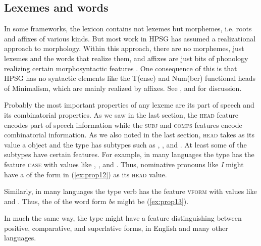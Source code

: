 \documentclass[output=paper
	        ,collection
	        ,collectionchapter
 	        ,biblatex
                ,babelshorthands
                ,newtxmath
                ,draftmode
                ,colorlinks, citecolor=brown
]{langscibook}
\begin{document}
\subsection{Lexemes and words}\label{sec:prop4.1}

In some frameworks, the lexicon contains not lexemes but morphemes, i.e. roots and affixes of various kinds. But most work in HPSG has assumed a realizational approach to morphology. Within this approach, there are no morphemes, just lexemes and the words that realize them, and affixes are just bits of phonology realizing certain morphosyntactic features \citep{Stump2001a-u-kopiert,Anderson92a-u}. One consequence of this is that HPSG has no syntactic elements like the T(ense) and Num(ber) functional heads of Minimalism\indexmp, which are mainly realized by affixes. See , \addpages and  for discussion.

Probably the most important properties of any lexeme are its part of speech and its combinatorial properties. As we saw in the last section, the \textsc{head} feature encodes part of speech information while the \textsc{subj} and \textsc{comps} features encode combinatorial information. As we also noted in the last section, \textsc{head} takes as its value a  object and the type  has subtypes such as , , and . At least some of the subtypes have certain features. For example, in many languages the type  has the feature \textsc{case} with values like , , and . Thus, nominative pronouns like \emph{I} might have a  of the form in (\ref{ex:prop12}) as its \textsc{head} value.

\ea\label{ex:prop12}
\z

\noindent
Similarly, in many languages the type verb has the feature \textsc{vform} with values like  and . Thus, the  of the word form \emph{be} might be (\ref{ex:prop13}).

\ea\label{ex:prop13}
\z

\noindent
In much the same way, the type  might have a feature distinguishing between positive, comparative, and superlative forms, in English and many other languages.
\end{document}
